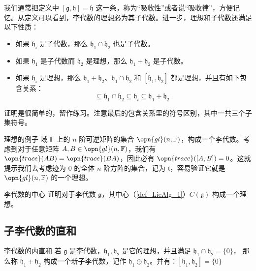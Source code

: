 我们通常把定义中 $[\mathfrak{g}, \mathfrak{h}]=\mathfrak{h}$ 这一条，称为“吸收性”或者说“吸收律”，方便记忆。从定义可以看到，李代数的理想必为其子代数。进一步，理想和子代数还满足以下性质：

\begin{itemize}
\item 如果 $\mathfrak{h}_i$ 是子代数，那么 $\mathfrak{h}_1\cap\mathfrak{h}_2$ 也是子代数。
\item 如果 $\mathfrak{h}_1$ 是子代数而 $\mathfrak{h}_2$ 是理想，那么 $\mathfrak{h}_1+\mathfrak{h}_2$ 是子代数。
\item 如果 $\mathfrak{h}_i$ 是理想，那么 $\mathfrak{h}_1+\mathfrak{h}_2$、$\mathfrak{h}_1\cap\mathfrak{h}_2$ 和 $[\mathfrak{h}_1, \mathfrak{h}_2]$ 都是理想，并且有如下包含关系：\begin{equation}
[\mathfrak{h}_1, \mathfrak{h}_2]\subseteq\mathfrak{h}_1\cap\mathfrak{h}_2\subseteq\mathfrak{h}_i\subseteq\mathfrak{h}_1+\mathfrak{h}_2~.
\end{equation}

\end{itemize}

证明是很简单的，留作练习。注意最后的包含关系里的符号区别，其中一共三个子集符号。

\begin{example}{理想的例子}%
域 $\mathbb{F}$ 上的 $n$ 阶可逆矩阵的集合 $\opn{gl}(n, \mathbb{F})$，构成一个李代数。考虑到对于任意矩阵 $A, B\in\opn{gl}(n, \mathbb{F})$，我们有 $\opn{trace}(AB)=\opn{trace}(BA)$，因此必有 $\opn{trace}([A, B])=0$。这就提示我们去考虑迹为 $0$ 的全体 $n$ 阶方阵的集合，记为 $\mathfrak{t}$，容易验证它就是 $\opn{gl}(n, \mathbb{F})$ 的一个理想。
\end{example}

\begin{exercise}{李代数的中心}
证明对于李代数 $\mathfrak{g}$，其中心（\autoref{def_LieAlg_1}）$C(\mathfrak{g})$ 构成一个理想。
\end{exercise}


\subsection{子李代数的直和}

\begin{definition}{李代数的内直和}
若 $\mathfrak{g}$ 是李代数，$\mathfrak{h}_1, \mathfrak{h}_2$ 是它的理想，并且满足 $\mathfrak{h}_1 \cap \mathfrak{h}_2 = \{0\}$， 那么称 $\mathfrak{h}_1 + \mathfrak{h}_2$ 构成一个新子李代数，记作 $\mathfrak{h}_1 \oplus \mathfrak{h}_2$。并有：$[\mathfrak{h}_1, \mathfrak{h}_2] = \{0\}$
\end{definition}

